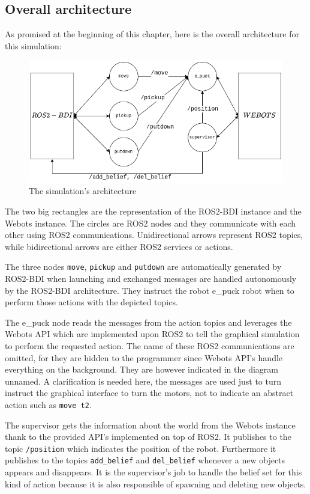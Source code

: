 \subsection{Overall architecture} 
As promised at the beginning of this chapter, here is the overall architecture for this simulation:
\begin{figure}[H]
\centering
\includegraphics[width=\textwidth]{images/simulation_architecture.png}
\caption{The simulation's architecture}
\end{figure}
The two big rectangles are the representation of the ROS2-BDI instance and the Webots instance. The circles are ROS2 nodes and they communicate with each other using ROS2 communications. Unidirectional arrows represent ROS2 topics, while bidirectional arrows are either ROS2 services or actions. 
\par
The three nodes \texttt{move}, \texttt{pickup} and \texttt{putdown} are automatically generated by ROS2-BDI when launching and exchanged messages are handled autonomously by the ROS2-BDI architecture. They instruct the robot e\_puck robot when to perform those actions with the depicted topics.
\par 
The e\_puck node reads the messages from the action topics and leverages the Webots API which are implemented upon ROS2 to tell the graphical simulation to perform the requested action. The name of these ROS2 communications are omitted, for they are hidden to the programmer since Webots API's handle everything on the background. They are however indicated in the diagram unnamed. A clarification is needed here, the messages are used just to turn instruct the graphical interface to turn the motors, not to indicate an abstract action such as \texttt{move t2}.
\par
The supervisor gets the information about the world from the Webots instance thank to the provided API's implemented on top of ROS2. It publishes to the topic \texttt{/position} which indicates the position of the robot. Furthermore it publishes to the topics \texttt{add\_belief} and \texttt{del\_belief} whenever a new objects appears and disappears. It is the supervisor's job to handle the belief set for this kind of action because it is also responsible of spawning and deleting new objects.
\newpage

